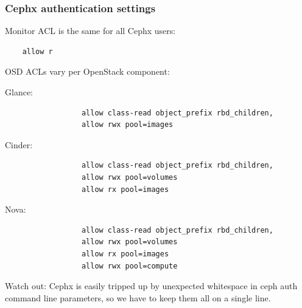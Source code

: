 \documentclass[hyperref=unicode,utf8,xcolor=pst]{beamer}
\begin{document}
\begin{frame}[fragile]
	\frametitle{Cephx authentication settings}

	Monitor ACL is the same for {\color{mirantisred}all} Cephx users:
	\vspace{-1ex}
	\begin{lstlisting}
	allow r
	\end{lstlisting}
	\vspace{1ex}

	OSD ACLs vary per OpenStack component:
	\vspace{-1ex}
	\begin{description}
		\item[Glance:]
			\begin{lstlisting}
			allow class-read object_prefix rbd_children,
			allow rwx pool=images
			\end{lstlisting}

		\vspace{-1.5ex}
		\item[Cinder:]
			\begin{lstlisting}
			allow class-read object_prefix rbd_children,
			allow rwx pool=volumes
			allow rx pool=images
			\end{lstlisting}

		\item[Nova:]
			\vspace{-1.5ex}
			\begin{lstlisting}
			allow class-read object_prefix rbd_children,
			allow rwx pool=volumes
			allow rx pool=images
			allow rwx pool=compute
			\end{lstlisting}
	\end{description}

	{\color{mirantisred}Watch out:} Cephx is easily tripped up by
	unexpected whitespace in ceph auth command line parameters, so
	we have to keep them all on a single line.
\end{frame}
\end{document}
